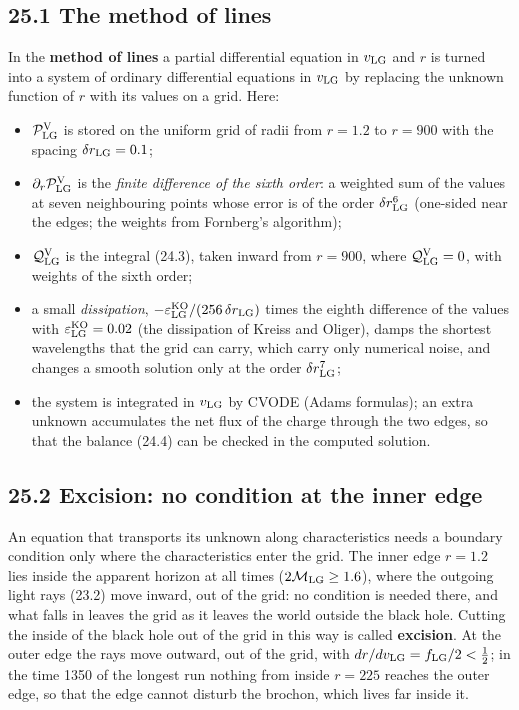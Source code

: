\documentclass[
  10pt,
]{article}
\providecommand{\tightlist}{%
  \setlength{\itemsep}{0pt}\setlength{\parskip}{0pt}}
\begin{document}
\hypertarget{the-method-of-lines}{%
\subsection{25.1 The method of lines}\label{the-method-of-lines}}

In the \textbf{method of lines} a partial differential equation in
\(v_{\rm LG}\) and \(r\) is turned into a system of ordinary
differential equations in \(v_{\rm LG}\) by replacing the unknown
function of \(r\) with its values on a grid. Here:

\begin{itemize}
\tightlist
\item
  \(\mathcal P^{\rm V}_{\rm LG}\) is stored on the uniform grid of radii
  from \(r=1.2\) to \(r=900\) with the spacing
  \(\delta r_{\rm LG}=0.1\);
\item
  \(\partial_r\mathcal P^{\rm V}_{\rm LG}\) is the \emph{finite
  difference of the sixth order}: a weighted sum of the values at seven
  neighbouring points whose error is of the order
  \(\delta r_{\rm LG}^6\) (one-sided near the edges; the weights from
  Fornberg's algorithm);
\item
  \(\mathcal Q^{\rm V}_{\rm LG}\) is the integral (24.3), taken inward
  from \(r=900\), where \(\mathcal Q^{\rm V}_{\rm LG}=0\), with weights
  of the sixth order;
\item
  a small \emph{dissipation},
  \(-\varepsilon^{\rm KO}_{\rm LG}/(256\,\delta r_{\rm LG})\) times the
  eighth difference of the values with
  \(\varepsilon^{\rm KO}_{\rm LG}=0.02\) (the dissipation of Kreiss and
  Oliger), damps the shortest wavelengths that the grid can carry, which
  carry only numerical noise, and changes a smooth solution only at the
  order \(\delta r_{\rm LG}^7\);
\item
  the system is integrated in \(v_{\rm LG}\) by CVODE (Adams formulas);
  an extra unknown accumulates the net flux of the charge through the
  two edges, so that the balance (24.4) can be checked in the computed
  solution.
\end{itemize}

\hypertarget{excision-no-condition-at-the-inner-edge}{%
\subsection{25.2 Excision: no condition at the inner
edge}\label{excision-no-condition-at-the-inner-edge}}

An equation that transports its unknown along characteristics needs a
boundary condition only where the characteristics enter the grid. The
inner edge \(r=1.2\) lies inside the apparent horizon at all times
(\(2\mathcal M_{\rm LG}\ge1.6\)), where the outgoing light rays (23.2)
move inward, out of the grid: no condition is needed there, and what
falls in leaves the grid as it leaves the world outside the black hole.
Cutting the inside of the black hole out of the grid in this way is
called \textbf{excision}. At the outer edge the rays move outward, out
of the grid, with \(dr/dv_{\rm LG}=f_{\rm LG}/2<\tfrac12\); in the time
1350 of the longest run nothing from inside \(r=225\) reaches the outer
edge, so that the edge cannot disturb the brochon, which lives far
inside it.
\end{document}
